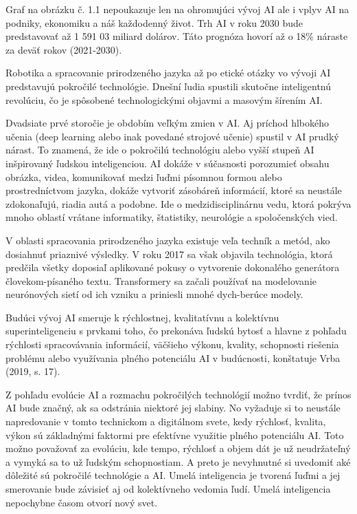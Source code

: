 Graf na obrázku č. 1.1  nepoukazuje len na ohromujúci vývoj AI ale i vplyv AI na podniky, ekonomiku a náš každodenný život. Trh AI v roku 2030 bude predstavovať až 1 591 03 miliard dolárov. Táto prognóza hovorí až o 18\% náraste za deväť rokov (2021-2030). 
\par Robotika a spracovanie prirodzeného jazyka až po etické otázky vo vývoji AI predstavujú pokročilé technológie. \cite{toolsforhumans2023} Dnešní ľudia spustili skutočne inteligentnú revolúciu, čo je spôsobené technologickými objavmi a masovým šírením AI. 
\par Dvadsiate prvé storočie je obdobím veľkým zmien v AI. Aj príchod hlbokého učenia (deep learning alebo inak povedané strojové učenie) spustil v AI prudký nárast.  To znamená, že ide o pokročilú technológiu alebo vyšší stupeň AI inšpirovaný ľudskou inteligenciou. AI dokáže v súčasnosti porozumieť obsahu obrázka, videa, komunikovať medzi ľuďmi písomnou formou alebo prostredníctvom jazyka, dokáže vytvoriť zásobáreň informácií, ktoré sa neustále zdokonaľujú, riadia autá a podobne.  Ide o medzidisciplinárnu vedu, ktorá pokrýva mnoho oblastí vrátane informatiky, štatistiky, neurológie a spoločenských vied. \cite{tencent2021}
\par V oblasti spracovania prirodzeného jazyka existuje veľa techník a metód, ako dosiahnuť priaznivé výsledky.  V roku 2017 sa však objavila technológia, ktorá predčila všetky doposiaľ aplikované pokusy o vytvorenie dokonalého generátora človekom-písaného textu.  Transformery sa začali používať na modelovanie neurónových sietí od ich vzniku a priniesli mnohé dych-berúce modely. \cite{novotny2020}
\par Budúci vývoj AI smeruje k rýchlostnej, kvalitatívnu a kolektívnu superinteligenciu s prvkami toho, čo prekonáva ľudskú bytosť a hlavne z pohľadu rýchlosti spracovávania informácií, väčšieho výkonu, kvality, schopnosti riešenia problému alebo využívania plného potenciálu AI v budúcnosti, konštatuje Vrba (2019, s. 17).
\par Z pohľadu evolúcie AI a rozmachu pokročilých technológií možno tvrdiť, že prínos AI bude značný, ak sa odstránia niektoré jej slabiny. No vyžaduje si to neustále napredovanie v tomto technickom a digitálnom svete, kedy rýchlosť, kvalita, výkon sú základnými faktormi pre efektívne využitie plného potenciálu AI. Toto možno považovať za evolúciu, kde tempo, rýchlosť a objem dát je už neudržateľný a vymyká sa to už ľudským schopnostiam. \cite{hlasny2023} A preto je nevyhnutné si uvedomiť aké dôležité sú pokročilé technológie a AI. Umelá inteligencia je tvorená ľuďmi a jej smerovanie bude závisieť aj od kolektívneho vedomia ľudí. Umelá inteligencia nepochybne časom otvorí nový svet. \cite{tencent2021}



